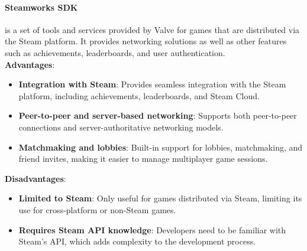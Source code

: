 \paragraph{Steamworks SDK} is a set of tools and services provided by Valve for games that are distributed via the Steam platform. It provides networking solutions as well as other features such as achievements, leaderboards, and user authentication.
\\
\textbf{Advantages}:
\begin{itemize}
    \item \textbf{Integration with Steam}: Provides seamless integration with the Steam platform, including achievements, leaderboards, and Steam Cloud.
    \item \textbf{Peer-to-peer and server-based networking}: Supports both peer-to-peer connections and server-authoritative networking models.
    \item \textbf{Matchmaking and lobbies}: Built-in support for lobbies, matchmaking, and friend invites, making it easier to manage multiplayer game sessions.
\end{itemize}

\textbf{Disadvantages}:
\begin{itemize}
    \item \textbf{Limited to Steam}: Only useful for games distributed via Steam, limiting its use for cross-platform or non-Steam games.
    \item \textbf{Requires Steam API knowledge}: Developers need to be familiar with Steam's API, which adds complexity to the development process.
\end{itemize}
